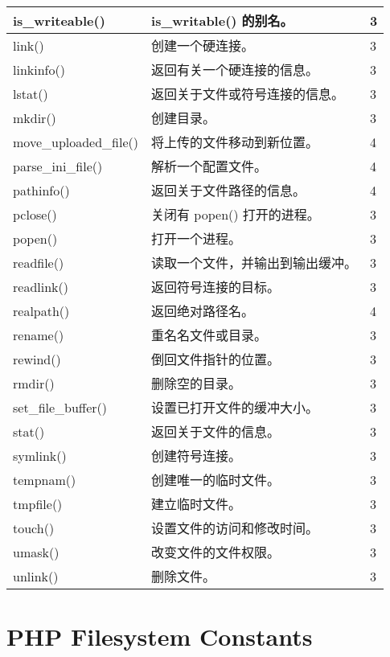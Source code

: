 \begin{longtable}{|m{120pt}|m{250pt}|m{20pt}|}
\hline
is\_writeable()	&is\_writable() 的别名。	&3\\
\hline
link()	&创建一个硬连接。	&3\\
\hline
linkinfo()	&返回有关一个硬连接的信息。	&3\\
\hline
lstat()	&返回关于文件或符号连接的信息。	&3\\
\hline
mkdir()	&创建目录。	&3\\
\hline
move\_uploaded\_file()	&将上传的文件移动到新位置。	&4\\
\hline
parse\_ini\_file()	&解析一个配置文件。	&4\\
\hline
pathinfo()	&返回关于文件路径的信息。	&4\\
\hline
pclose()	&关闭有 popen() 打开的进程。	&3\\
\hline
popen()	&打开一个进程。	&3\\
\hline
readfile()	&读取一个文件，并输出到输出缓冲。	&3\\
\hline
readlink()	&返回符号连接的目标。	&3\\
\hline
realpath()	&返回绝对路径名。	&4\\
\hline
rename()	&重名名文件或目录。	&3\\
\hline
rewind()	&倒回文件指针的位置。	&3\\
\hline
rmdir()	&删除空的目录。	&3\\
\hline
set\_file\_buffer()	&设置已打开文件的缓冲大小。	&3\\
\hline
stat()	&返回关于文件的信息。	&3\\
\hline
symlink()	&创建符号连接。	&3\\
\hline
tempnam()	&创建唯一的临时文件。&	3\\
\hline
tmpfile()	&建立临时文件。	&3\\
\hline
touch()	&设置文件的访问和修改时间。	&3\\
\hline
umask()	&改变文件的文件权限。	&3\\
\hline
unlink()	&删除文件。	&3\\
\hline
\end{longtable}


\section{PHP Filesystem Constants}


